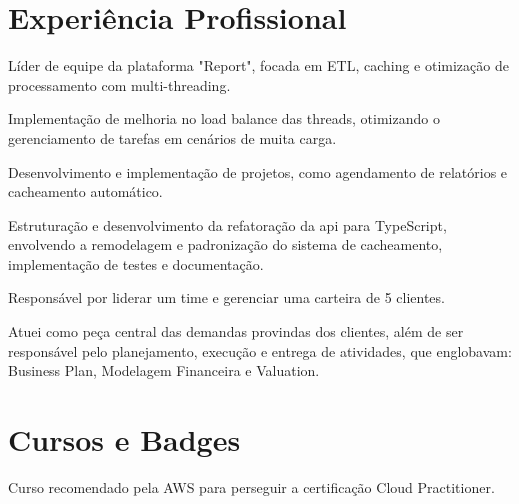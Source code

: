 \documentclass[]{deedy-resume-openfont}
\begin{document}
\begin{minipage}[t]{0.63\textwidth} 


\section{Experiência Profissional}
\vspace{\topsep} %
\begin{tightemize}
\item Líder de equipe da plataforma "Report", focada em ETL, caching e otimização de processamento com multi-threading.
\item Implementação de melhoria no load balance das threads, otimizando o gerenciamento de tarefas em cenários de muita carga.
\item Desenvolvimento e implementação de projetos, como agendamento de relatórios e cacheamento automático.
\item Estruturação e desenvolvimento da refatoração da api para TypeScript, envolvendo a remodelagem e padronização do sistema de cacheamento, implementação de testes e documentação.
\end{tightemize}
\sectionsep

\begin{tightemize}
\item Responsável por liderar um time e gerenciar uma carteira de 5 clientes.
\item Atuei como peça central das demandas provindas dos clientes, além de ser responsável pelo planejamento, execução e entrega de atividades, que englobavam: Business Plan, Modelagem Financeira e Valuation.
\end{tightemize}
\sectionsep

\section{Cursos e Badges}
\begin{tightemize}
\item Curso recomendado pela AWS para perseguir a certificação Cloud Practitioner.
\end{tightemize}
\sectionsep


\end{minipage}
\end{document}
